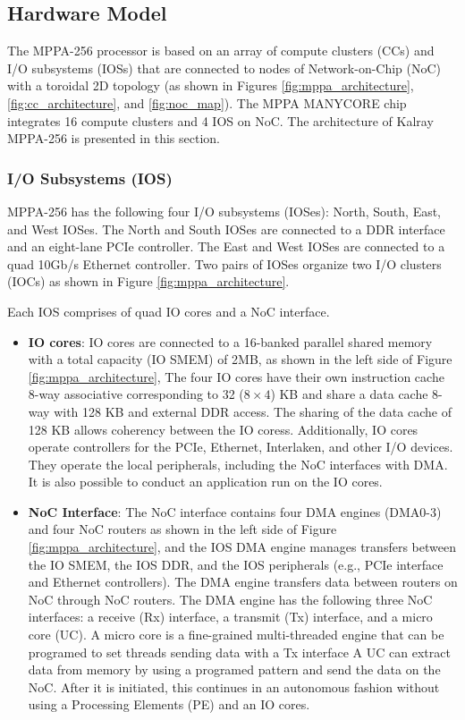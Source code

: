 \documentclass{sig-alternate-05-2015}
\begin{document}
\subsection{Hardware Model}
\label{sec:hardware_model}
The MPPA-256 processor is based on an array of compute clusters (CCs) and I/O subsystems (IOSs) that are connected to nodes of Network-on-Chip (NoC) with a toroidal 2D topology 
(as shown in Figures \ref{fig:mppa_architecture}, \ref{fig:cc_architecture}, and \ref{fig:noc_map}).
The MPPA MANYCORE chip integrates 16 compute clusters and 4 IOS on NoC.
The architecture of Kalray MPPA-256 is presented in this section.

\subsubsection{I/O Subsystems (IOS)}
\label{sec:ios}
MPPA-256 has the following four I/O subsystems (IOSes): North, South, East, and West IOSes.
The North and South IOSes are connected to a DDR interface and an eight-lane PCIe controller.
The East and West IOSes are connected to a quad 10Gb/s Ethernet controller.
Two pairs of IOSes organize two I/O clusters (IOCs) as shown in Figure \ref{fig:mppa_architecture}.

Each IOS comprises of quad IO cores and a NoC interface.
\begin{itemize}
\item \textbf{IO cores}: IO cores are connected to a 16-banked parallel shared memory with a total capacity (IO SMEM) of 2MB, as shown in the left side of Figure \ref{fig:mppa_architecture},
The four IO cores have their own instruction cache 8-way associative corresponding to 32 ($8 \times 4$) KB and share a data cache 8-way with 128 KB and external DDR access.
The sharing of the data cache of 128 KB allows coherency between the IO coress.
Additionally, IO cores operate controllers for the PCIe, Ethernet, Interlaken, and other I/O devices.
They operate the local peripherals, including the NoC interfaces with DMA.
It is also possible to conduct an application run on the IO cores.
\item \textbf{NoC Interface}: The NoC interface contains four DMA engines (DMA0-3) and four NoC routers as shown in the left side of Figure \ref{fig:mppa_architecture}, and the IOS DMA engine manages transfers between the IO SMEM, the IOS DDR, and the IOS peripherals (e.g., PCIe interface and Ethernet controllers).
The DMA engine transfers data between routers on NoC through NoC routers.
The DMA engine has the following three NoC interfaces: a receive (Rx) interface, a transmit (Tx) interface, and a micro core (UC).
A micro core is a fine-grained multi-threaded engine that can be programed to set threads sending data with a Tx interface
A UC can extract data from memory by using a programed pattern and send the data on the NoC.
After it is initiated, this continues in an autonomous fashion without using a Processing Elements (PE) and an IO cores.
\end{itemize}
\end{document}
